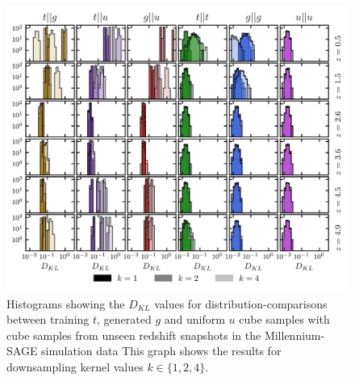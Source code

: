 \documentclass[twocolumn]{article}
\numberwithin{equation}{section}
\begin{document}
\begin{figure}[hbt!]
\includegraphics[width=17cm]{figures/graphs/kl_trials_all_z_unseen1.png}
\centering
\caption{Histograms showing the $D_{KL}$ values for distribution-comparisons between training $t$, generated $g$ and 
         uniform $u$ cube samples with cube samples from unseen redshift snapshots in the Millennium-SAGE simulation 
         data This graph shows the results for downsampling kernel values $k \in \{1, 2, 4\}$.}
\label{fig:kl_trials_all_z2}
\end{figure}
\end{document}
